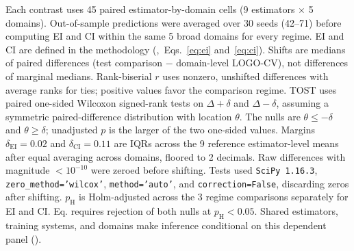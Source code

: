 \documentclass{article}
\begin{document}
\begin{table}[H]
\begin{minipage}{\linewidth}
Each contrast uses 45 paired estimator-by-domain cells (9 estimators $\times$ 5 domains). Out-of-sample predictions were averaged over 30 seeds (42--71) before computing EI and CI within the same 5 broad domains for every regime. EI and CI are defined in the methodology (,~Eqs.~\eqref{eq:ei} and~\eqref{eq:ci}). Shifts are medians of paired differences (test comparison $-$ domain-level LOGO-CV), not differences of marginal medians. Rank-biserial $r$ uses nonzero, unshifted differences with average ranks for ties; positive values favor the comparison regime. TOST uses paired one-sided Wilcoxon signed-rank tests on $\Delta+\delta$ and $\Delta-\delta$, assuming a symmetric paired-difference distribution with location $\theta$. The nulls are $\theta\leq-\delta$ and $\theta\geq\delta$; unadjusted $p$ is the larger of the two one-sided values. Margins $\delta_{\mathrm{EI}} = 0.02$ and $\delta_{\mathrm{CI}} = 0.11$ are IQRs across the 9 reference estimator-level means after equal averaging across domains, floored to 2 decimals. Raw differences with magnitude $<10^{-10}$ were zeroed before shifting. Tests used \texttt{SciPy 1.16.3}, \texttt{zero\_method='wilcox'}, \texttt{method='auto'}, and \texttt{correction=False}, discarding zeros after shifting. $p_{\mathrm H}$ is Holm-adjusted across the 3 regime comparisons separately for EI and CI. Eq. requires rejection of both nulls at $p_{\mathrm H}<0.05$. Shared estimators, training systems, and domains make inference conditional on this dependent panel ().
\end{minipage}
\end{table}
\end{document}
